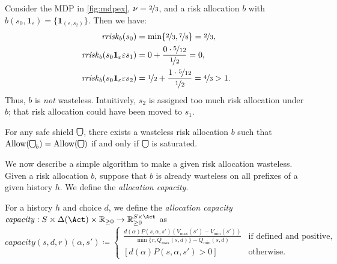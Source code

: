 \documentclass[runningheads]{llncs}
\newcommand{\Distr}{\Delta}
\newcommand{\Allow}{\mathrm{Allow}}
\newcommand{\Dirac}{\mathbf{1}}
\newcommand\shieldbase{%
  \tikz[baseline=0.2ex] \draw[semithick]
    (0,1.75ex) -- (0,0.75ex)
    arc [radius=0.75ex, start angle=-180, end angle=0]
    -- (1.5ex,1.75ex) -- cycle;%
}
\DeclareRobustCommand\shield{%
  \mathord{\scalerel*{\shieldbase}{\bigcirc}}%
}
\newcommand{\capacity}{\mathit{capacity}}
\newcommand{\rrisk}{\mathit{rrisk}}
\begin{document}
\begin{example}
    Consider the MDP in \cref{fig:mdpex}, \(\nu = \nicefrac{2}{3}\), and a risk allocation \(b\) with \(b(s_0, \Dirac_\varepsilon) = \{\Dirac_{(\varepsilon, s_2)}\}\).
    Then we have:
    \begin{align*}
        \rrisk_b(s_0) &= \min \{\nicefrac{2}{3}, \nicefrac{7}{8}\} = \nicefrac{2}{3}, \\
        \rrisk_b(s_0 \Dirac_{\varepsilon} \varepsilon s_1) &= 0 + \frac{0 \cdot \nicefrac{5}{12}}{\nicefrac{1}{2}} = 0, \\
        \rrisk_b(s_0 \Dirac_{\varepsilon} \varepsilon s_2) &= \nicefrac{1}{2} + \frac{1 \cdot \nicefrac{5}{12}}{\nicefrac{1}{2}} = \nicefrac{4}{3} > 1.
    \end{align*}
    Thus, \(b\) is \emph{not} wasteless. Intuitively, \(s_2\) is assigned too much risk allocation under \(b\); that risk allocation could have been moved to \(s_1\).
\end{example}



\begin{theorem}
    \label{thm:wastlesssaturated}
    For any safe shield \(\shield\), there exists a wasteless risk allocation \(b\) such that \(\Allow(\shield_b) = \Allow(\shield)\) if and only if \(\shield\) is saturated.
\end{theorem}


We now describe a simple algorithm to make a given risk allocation wasteless.
Given a risk allocation \(b\), suppose that \(b\) is already wasteless on all prefixes of a given history \(h\).
We define the \emph{allocation capacity}.
\begin{definition}
    \label{def:capacity}
    For a history \(h\) and choice \(d\), we define the \emph{allocation capacity} \(\capacity: S \times \Distr(\Act) \times \mathbb{R}_{\geq 0} \rightarrow \mathbb{R}_{\geq 0}^{S \times \Act}\) as \[
        \capacity(s, d, r)(\alpha, s') \coloneq 
        \begin{cases}
            \frac{d(\alpha) P(s,\alpha,s') (V_{\max}(s') - V_{\min}(s'))}{\min \{r, Q_{\max}(s, d)\} - Q_{\min}(s,d)} &\text{if defined and positive}, \\
            [d(\alpha) P(s,\alpha,s') > 0] &\text{otherwise.}
        \end{cases}
    \]
\end{definition}
\end{document}
